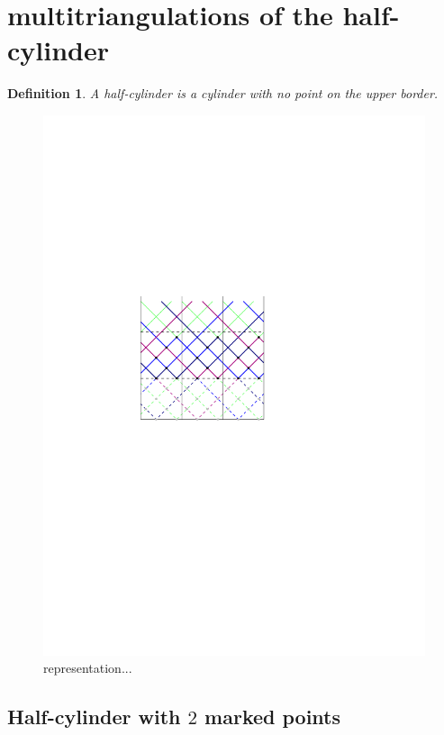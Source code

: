 \documentclass{amsart}
\newtheorem{definition}[theorem]{Definition}
\theoremstyle{remark}
\newcommand{\darkblue}{\color{darkblue}} %
\newcommand{\defn}[1]{\textsl{\darkblue #1}} %
\begin{document}

\section{multitriangulations of the half-cylinder}

\begin{definition}
A \defn{half-cylinder} is a cylinder with no point on the upper border.
\end{definition}

\begin{figure}
\label{fig:saturatedHC2}
\includegraphics[scale=1]{saturatedHC}
\caption{representation...}
\end{figure}


\subsection{Half-cylinder with $2$ marked points}
\end{document}
